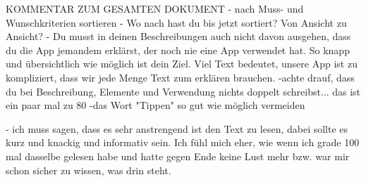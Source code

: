 KOMMENTAR ZUM GESAMTEN DOKUMENT
- nach Muss- und Wunschkriterien sortieren
- Wo nach hast du bis jetzt sortiert? Von Ansicht zu Ansicht?
- Du musst in deinen Beschreibungen auch nicht davon ausgehen, dass du die App jemandem erklärst, der noch nie eine App verwendet hat. So knapp  und übersichtlich wie möglich ist dein Ziel. Viel Text bedeutet, unsere App ist zu kompliziert, dass wir jede Menge Text zum erklären brauchen. 
-achte drauf, dass du bei Beschreibung, Elemente und Verwendung nichts doppelt schreibst... das ist ein paar mal zu 80%
-das Wort "Tippen" so gut wie möglich vermeiden

- ich muss sagen, dass es sehr anstrengend ist den Text zu lesen, dabei sollte es kurz und knackig und informativ sein. Ich fühl mich eher, wie wenn ich grade 100 mal dasselbe gelesen habe und hatte gegen Ende keine Lust mehr bzw. war mir schon sicher zu wissen, was drin steht.  


